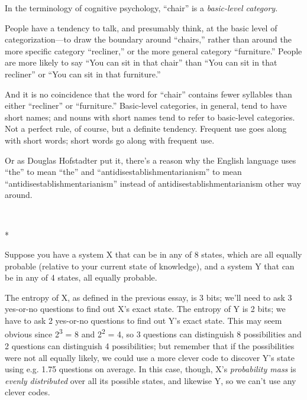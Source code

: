 {
 In the terminology of cognitive psychology,
``chair'' is a \textit{basic-level
category.}}

{
 People have a tendency to talk, and presumably think, at the basic
level of categorization---to draw the boundary around
``chairs,'' rather than around the
more specific category ``recliner,''
or the more general category
``furniture.'' People are more
likely to say ``You can sit in that
chair'' than ``You can sit in that
recliner'' or ``You can sit in that
furniture.''}

{
 And it is no coincidence that the word for
``chair'' contains fewer syllables
than either ``recliner'' or
``furniture.'' Basic-level
categories, in general, tend to have short names; and nouns with short
names tend to refer to basic-level categories. Not a perfect rule, of
course, but a definite tendency. Frequent use goes along with short
words; short words go along with frequent use.}

{
 Or as Douglas Hofstadter put it, there's a reason
why the English language uses
``the'' to mean
``the'' and
``antidisestablishmentarianism'' to
mean
``antidisestablishmentarianism''
instead of antidisestablishmentarianism other way around.}

{\centering
 \ ~
\par}

{\centering
 *
\par}


{
 Suppose you have a system X that can be in any of 8 states, which
are all equally probable (relative to your current state of knowledge),
and a system Y that can be in any of 4 states, all equally probable. }

{
 The entropy of X, as defined in the previous essay, is 3 bits;
we'll need to ask 3 yes-or-no questions to find out
X's exact state. The entropy of Y is 2 bits; we have to
ask 2 yes-or-no questions to find out Y's exact state.
This may seem obvious since 2\textsuperscript{3} = 8 and
2\textsuperscript{2} = 4, so 3 questions can distinguish 8
possibilities and 2 questions can distinguish 4 possibilities; but
remember that if the possibilities were not all equally likely, we
could use a more clever code to discover Y's state
using e.g. 1.75 questions on average. In this case, though,
X's \textit{probability mass} is \textit{evenly
distributed} over all its possible states, and likewise Y, so we
can't use any clever codes.}


